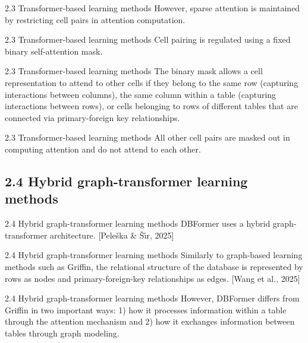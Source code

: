 \documentclass[aspectratio=169,10pt]{beamer}
\newcommand{\cit}[1]{{\scriptsize\color{gray}[#1]}}
\begin{document}
\begin{frame}{2.3 Transformer-based learning methods}
However, sparse attention is maintained by restricting cell pairs in attention computation.
\end{frame}

\begin{frame}{2.3 Transformer-based learning methods}
Cell pairing is regulated using a fixed binary self-attention mask.
\end{frame}

\begin{frame}{2.3 Transformer-based learning methods}
The binary mask allows a cell representation to attend to other cells if they belong to the same row (capturing interactions between columns), the same column within a table (capturing interactions between rows), or cells belonging to rows of different tables that are connected via primary-foreign key relationships.
\end{frame}

\begin{frame}{2.3 Transformer-based learning methods}
All other cell pairs are masked out in computing attention and do not attend to each other.
\end{frame}

\subsection{2.4 Hybrid graph-transformer learning methods}

\begin{frame}{2.4 Hybrid graph-transformer learning methods}
DBFormer uses a hybrid graph-transformer architecture.
\cit{Pele\v{s}ka \& \v{S}\'{\i}r, 2025}
\end{frame}

\begin{frame}{2.4 Hybrid graph-transformer learning methods}
Similarly to graph-based learning methods such as Griffin, the relational structure of the database is represented by rows as nodes and primary-foreign-key relationships as edges.
\cit{Wang et al., 2025}
\end{frame}

\begin{frame}{2.4 Hybrid graph-transformer learning methods}
However, DBFormer differs from Griffin in two important ways: 1) how it processes information within a table through the attention mechanism and 2) how it exchanges information between tables through graph modeling.
\end{frame}
\end{document}
